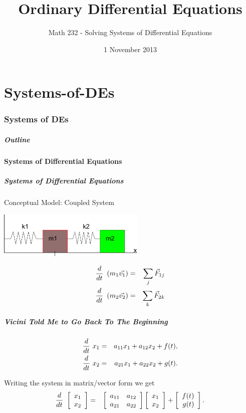 \part{Systems-of-DEs}
\section{Systems of DEs}


\title{Ordinary Differential Equations}
\subtitle{Math 232 - Solving Systems of Differential Equations}
\date{1 November 2013}

\begin{frame}
  \titlepage
\end{frame}

\begin{frame}
  \frametitle{Outline}
  \tableofcontents[ currentsection ]
\end{frame}


\subsection{Systems of Differential Equations}


\begin{frame}
  \frametitle{Systems of Differential Equations}

  Conceptual Model: Coupled System \\
  \centerline{\includegraphics[width=7cm]{img/doubleSpringMass}}

  \begin{eqnarray*}
    \deriv{~}{t} \lp m_1 \vec{v_1} \rp & = & \sum_j \vec{F}_{1j} \\
    \deriv{~}{t} \lp m_2 \vec{v_2} \rp & = & \sum_k \vec{F}_{2k} 
  \end{eqnarray*}


\end{frame}


\begin{frame}
  \frametitle{Vicini Told Me to Go Back To The Beginning}

  \begin{eqnarray*}
    \deriv{~}{t} x_1  & = & a_{11} x_1 + a_{12} x_2 + f(t), \\
    \deriv{~}{t} x_2  & = & a_{21} x_1 + a_{22} x_2 + g(t).
  \end{eqnarray*}

  Writing the system in matrix/vector form we get
  \begin{eqnarray*}
    \deriv{~}{t} \vecTwo{x_1}{x_2} & = & 
    \arrayTwo{a_{11}}{a_{12}}{a_{21}}{a_{22}} \vecTwo{x_1}{x_2} + 
    \vecTwo{f(t)}{g(t)}.
  \end{eqnarray*}

\end{frame}


